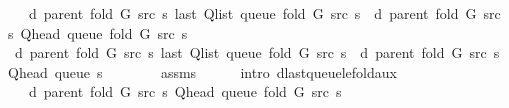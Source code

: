 \begin{isabellebody}
\ \ \ {\isachardoublequoteopen}d\ {\isacharparenleft}{\kern0pt}parent\ {\isacharparenleft}{\kern0pt}fold\ G\ src\ s{\isacharparenright}{\kern0pt}{\isacharparenright}{\kern0pt}\ {\isacharparenleft}{\kern0pt}last\ {\isacharparenleft}{\kern0pt}Q{\isacharunderscore}{\kern0pt}list\ {\isacharparenleft}{\kern0pt}queue\ {\isacharparenleft}{\kern0pt}fold\ G\ src\ s{\isacharparenright}{\kern0pt}{\isacharparenright}{\kern0pt}{\isacharparenright}{\kern0pt}{\isacharparenright}{\kern0pt}\ {\isasymle}\ d\ {\isacharparenleft}{\kern0pt}parent\ {\isacharparenleft}{\kern0pt}fold\ G\ src\ s{\isacharparenright}{\kern0pt}{\isacharparenright}{\kern0pt}\ {\isacharparenleft}{\kern0pt}Q{\isacharunderscore}{\kern0pt}head\ {\isacharparenleft}{\kern0pt}queue\ {\isacharparenleft}{\kern0pt}fold\ G\ src\ s{\isacharparenright}{\kern0pt}{\isacharparenright}{\kern0pt}{\isacharparenright}{\kern0pt}\ {\isacharplus}{\kern0pt}\ {}{\isachardoublequoteclose}\isanewline
%
\isadelimproof
%
\endisadelimproof
%
\isatagproof
{}\isamarkupfalse%
\ {\isacharminus}{\kern0pt}\isanewline
\ \ \isamarkupfalse%
\ {\isachardoublequoteopen}d\ {\isacharparenleft}{\kern0pt}parent\ {\isacharparenleft}{\kern0pt}fold\ G\ src\ s{\isacharparenright}{\kern0pt}{\isacharparenright}{\kern0pt}\ {\isacharparenleft}{\kern0pt}last\ {\isacharparenleft}{\kern0pt}Q{\isacharunderscore}{\kern0pt}list\ {\isacharparenleft}{\kern0pt}queue\ {\isacharparenleft}{\kern0pt}fold\ G\ src\ s{\isacharparenright}{\kern0pt}{\isacharparenright}{\kern0pt}{\isacharparenright}{\kern0pt}{\isacharparenright}{\kern0pt}\ {\isasymle}\ d\ {\isacharparenleft}{\kern0pt}parent\ {\isacharparenleft}{\kern0pt}fold\ G\ src\ s{\isacharparenright}{\kern0pt}{\isacharparenright}{\kern0pt}\ {\isacharparenleft}{\kern0pt}Q{\isacharunderscore}{\kern0pt}head\ {\isacharparenleft}{\kern0pt}queue\ s{\isacharparenright}{\kern0pt}{\isacharparenright}{\kern0pt}\ {\isacharplus}{\kern0pt}\ {}{\isachardoublequoteclose}\isanewline
\ \ \ \ \isamarkupfalse%
\ assms\isanewline
\ \ \ \ \isamarkupfalse%
\ {\isacharparenleft}{\kern0pt}intro\ d{\isacharunderscore}{\kern0pt}last{\isacharunderscore}{\kern0pt}queue{\isacharunderscore}{\kern0pt}le{\isacharunderscore}{\kern0pt}fold{\isacharunderscore}{\kern0pt}aux{\isacharparenright}{\kern0pt}\isanewline
\ \ \isamarkupfalse%
\ \isamarkupfalse%
\ {\isachardoublequoteopen}{\isachardot}{\kern0pt}{\isachardot}{\kern0pt}{\isachardot}{\kern0pt}\ {\isasymle}\ d\ {\isacharparenleft}{\kern0pt}parent\ {\isacharparenleft}{\kern0pt}fold\ G\ src\ s{\isacharparenright}{\kern0pt}{\isacharparenright}{\kern0pt}\ {\isacharparenleft}{\kern0pt}Q{\isacharunderscore}{\kern0pt}head\ {\isacharparenleft}{\kern0pt}queue\ {\isacharparenleft}{\kern0pt}fold\ G\ src\ s{\isacharparenright}{\kern0pt}{\isacharparenright}{\kern0pt}{\isacharparenright}{\kern0pt}\ {\isacharplus}{\kern0pt}\ {}{\isachardoublequoteclose}\isanewline

\end{isabellebody}
